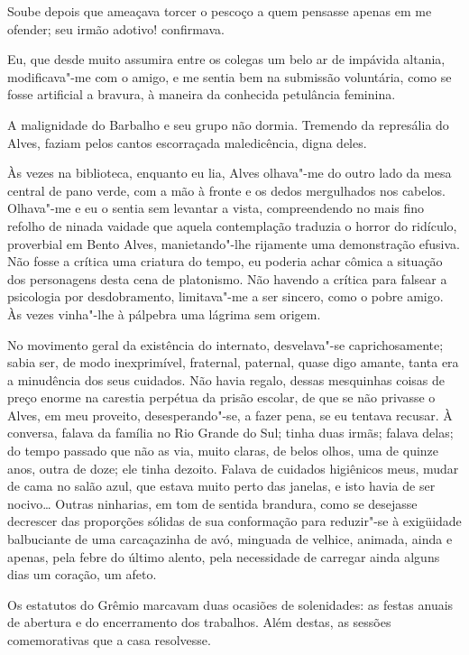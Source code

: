 Soube depois que ameaçava torcer o pescoço a
quem pensasse apenas em me ofender; seu irmão adotivo! confirmava. 

Eu, que desde muito assumira entre os colegas um belo ar de impávida
altania, modificava"-me com o amigo, e me sentia bem na submissão
voluntária, como se fosse artificial a bravura, à maneira da conhecida
petulância feminina. 

A malignidade do Barbalho e seu grupo não dormia.
Tremendo da represália do Alves, faziam pelos cantos escorraçada
maledicência, digna deles. 


Às vezes na biblioteca, enquanto eu lia,
Alves olhava"-me do outro lado da mesa central de pano verde, com a
mão à fronte e os dedos mergulhados nos cabelos. Olhava"-me e eu o
sentia sem levantar a vista, compreendendo no mais fino refolho de
ninada vaidade que aquela contemplação traduzia o horror do ridículo,
proverbial em Bento Alves, manietando"-lhe rijamente uma demonstração
efusiva. Não fosse a crítica uma criatura do tempo, eu poderia achar
cômica a situação dos personagens desta cena de platonismo. Não havendo
a crítica para falsear a psicologia por desdobramento, limitava"-me a
ser sincero, como o pobre amigo. Às vezes vinha"-lhe à pálpebra uma
lágrima sem origem. 

No movimento geral da existência do internato,
desvelava"-se caprichosamente; sabia ser, de modo inexprimível,
fraternal, paternal, quase digo amante, tanta era a minudência dos seus
cuidados. Não havia regalo, dessas mesquinhas coisas de preço enorme na
carestia perpétua da prisão escolar, de que se não privasse o Alves, em
meu proveito, desesperando"-se, a fazer pena, se eu tentava recusar. À
conversa, falava da família no Rio Grande do Sul; tinha duas irmãs;
falava delas; do tempo passado que não as via, muito claras, de belos olhos, 
uma de quinze anos, outra de doze; ele tinha dezoito. Falava de cuidados higiênicos
meus, mudar de cama no salão azul, que estava muito perto das janelas,
e isto havia de ser nocivo\ldots{} Outras ninharias, em tom de sentida
brandura, como se desejasse decrescer das proporções sólidas de sua
conformação para reduzir"-se à exigüidade balbuciante de uma
carcaçazinha de avó, minguada de velhice, animada, ainda e apenas, pela
febre do último alento, pela necessidade de carregar ainda alguns dias
um coração, um afeto. 

Os estatutos do Grêmio marcavam duas ocasiões de
solenidades: as festas anuais de abertura e do encerramento dos
trabalhos. Além destas, as sessões comemorativas que a casa resolvesse.

